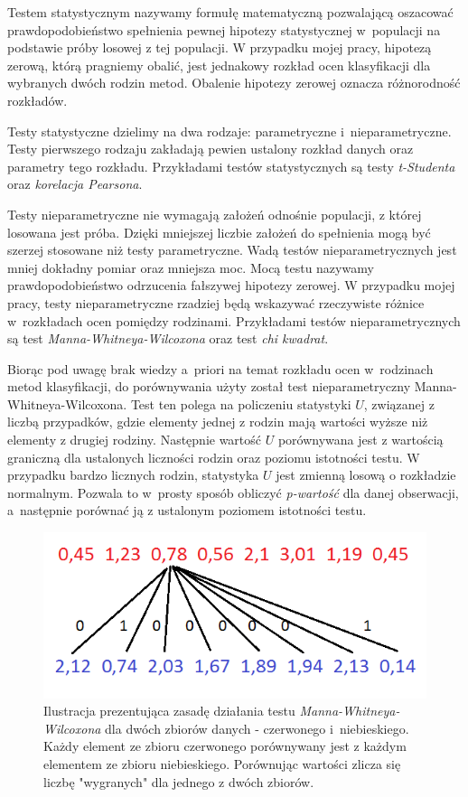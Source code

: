 \documentclass[../thesis.tex]{subfiles}
\begin{document}
Testem statystycznym nazywamy formułę matematyczną pozwalającą oszacować prawdopodobieństwo spełnienia pewnej hipotezy statystycznej w~populacji na podstawie próby losowej z tej populacji. W przypadku mojej pracy, hipotezą zerową, którą pragniemy obalić, jest jednakowy rozkład ocen klasyfikacji dla wybranych dwóch rodzin metod. Obalenie hipotezy zerowej oznacza różnorodność rozkładów.

Testy statystyczne dzielimy na dwa rodzaje: parametryczne i~nieparametryczne. Testy pierwszego rodzaju zakładają pewien ustalony rozkład danych oraz parametry tego rozkładu. Przykładami testów statystycznych są testy \emph{t-Studenta} oraz \emph{korelacja Pearsona}.

Testy nieparametryczne nie wymagają założeń odnośnie populacji, z której losowana jest próba. Dzięki mniejszej liczbie założeń do spełnienia mogą być szerzej stosowane niż testy parametryczne. Wadą testów nieparametrycznych jest mniej dokładny pomiar oraz mniejsza moc. Mocą testu nazywamy prawdopodobieństwo odrzucenia fałszywej hipotezy zerowej. W przypadku mojej pracy, testy nieparametryczne rzadziej będą wskazywać rzeczywiste różnice w~rozkładach ocen pomiędzy rodzinami. Przykładami testów nieparametrycznych są test \emph{Manna-Whitneya-Wilcoxona} oraz test \emph{chi kwadrat}. 

Biorąc pod uwagę brak wiedzy a~priori na temat rozkładu ocen w~rodzinach metod klasyfikacji, do porównywania użyty został test nieparametryczny Manna-Whitneya-Wilcoxona. Test ten polega na policzeniu statystyki $U$, związanej z liczbą przypadków, gdzie elementy jednej z rodzin mają wartości wyższe niż elementy z drugiej rodziny. Następnie wartość $U$ porównywana jest z wartością graniczną dla ustalonych liczności rodzin oraz poziomu istotności testu. W przypadku bardzo licznych rodzin, statystyka $U$ jest zmienną losową o rozkładzie normalnym. Pozwala to w~prosty sposób obliczyć \emph{p-wartość} dla danej obserwacji, a~następnie porównać ją z ustalonym poziomem istotności testu.

\begin{figure}[h]
\centering
\includegraphics[height=.15\textheight]{umann.png}
\caption{Ilustracja prezentująca zasadę działania testu \emph{Manna-Whitneya-Wilcoxona} dla dwóch zbiorów danych - czerwonego i~niebieskiego. Każdy element ze zbioru czerwonego porównywany jest z każdym elementem ze zbioru niebieskiego. Porównując wartości zlicza się liczbę "wygranych" dla jednego z dwóch zbiorów. }
\label{classification:umann}
\end{figure}
\end{document}
